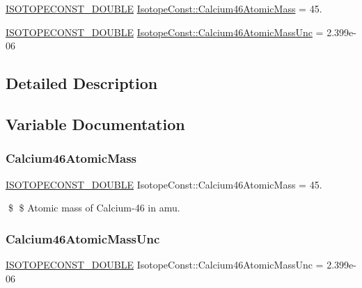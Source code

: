\begin{DoxyCompactItemize}
\item 
\mbox{\hyperlink{group___isotope_const-_macros_ga8f45a7272ce02c0b4c65c44636ed719a}{I\+S\+O\+T\+O\+P\+E\+C\+O\+N\+S\+T\+\_\+\+D\+O\+U\+B\+LE}} \mbox{\hyperlink{group___isotope_const-_calcium-_ca46_ga3ebeb3b815cfa968371caf3f9be3289c}{Isotope\+Const\+::\+Calcium46\+Atomic\+Mass}} = 45.
\item 
\mbox{\hyperlink{group___isotope_const-_macros_ga8f45a7272ce02c0b4c65c44636ed719a}{I\+S\+O\+T\+O\+P\+E\+C\+O\+N\+S\+T\+\_\+\+D\+O\+U\+B\+LE}} \mbox{\hyperlink{group___isotope_const-_calcium-_ca46_ga72f32fa13811b521b911f5fd526c7518}{Isotope\+Const\+::\+Calcium46\+Atomic\+Mass\+Unc}} = 2.\+399e-\/06
\end{DoxyCompactItemize}


\subsection{Detailed Description}


\subsection{Variable Documentation}
\mbox{\label{group___isotope_const-_calcium-_ca46_ga3ebeb3b815cfa968371caf3f9be3289c}} 
\subsubsection{\texorpdfstring{Calcium46\+Atomic\+Mass}{Calcium46AtomicMass}}
{\footnotesize\ttfamily \mbox{\hyperlink{group___isotope_const-_macros_ga8f45a7272ce02c0b4c65c44636ed719a}{I\+S\+O\+T\+O\+P\+E\+C\+O\+N\+S\+T\+\_\+\+D\+O\+U\+B\+LE}} Isotope\+Const\+::\+Calcium46\+Atomic\+Mass = 45.}

\$ \$ Atomic mass of Calcium-\/46 in amu. \mbox{\label{group___isotope_const-_calcium-_ca46_ga72f32fa13811b521b911f5fd526c7518}} 
\subsubsection{\texorpdfstring{Calcium46\+Atomic\+Mass\+Unc}{Calcium46AtomicMassUnc}}
{\footnotesize\ttfamily \mbox{\hyperlink{group___isotope_const-_macros_ga8f45a7272ce02c0b4c65c44636ed719a}{I\+S\+O\+T\+O\+P\+E\+C\+O\+N\+S\+T\+\_\+\+D\+O\+U\+B\+LE}} Isotope\+Const\+::\+Calcium46\+Atomic\+Mass\+Unc = 2.\+399e-\/06}

